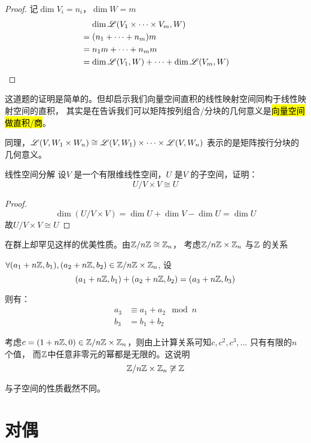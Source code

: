 \begin{proof}
    记\(\dim V_{i}=n_{i}\)，\(\dim W=m\)
    \begin{align*}
        &\mathrel{\phantom{=}}\dim \mathscr{L}(V_{1} \times
        \dots \times V_{m}, W) \\
        &= (n_1+\dots+n_{m})m \\
        &= n_{1}m + \dots + n_{m}m \\
        &= \dim \mathscr{L}(V_{1},W) + \dots +
        \dim \mathscr{L}(V_{m},W)
    \end{align*}
\end{proof}
这道题的证明是简单的。但却启示我们向量空间直积的线性映射空间同构于线性映射空间的直积，
其实是在告诉我们可以矩阵按列组合/分块的几何意义是\hl{向量空间做直积/商}。

同理，\(\mathscr{L}(V,W_1\times W_{n})\cong
    \mathscr{L}(V,W_1)\times \dots \times
\mathscr{L}(V,W_{n})\) 表示的是矩阵按行分块的几何意义。

\begin{problem}{线性空间分解}
    设\(V\) 是一个有限维线性空间，\(U\) 是\(V\) 的子空间，证明：
    \[
        U/V \times V \cong U
    \]
\end{problem}

\begin{proof}
    \[
        \dim (U/V \times V) = \dim U + \dim V - \dim U = \dim U
    \]
    故\(U/V \times V \cong U\)
\end{proof}

在群上却罕见这样的优美性质。由\(\mathbb{Z}/n\mathbb{Z} \cong
\mathbb{Z}_{n}\)，
考虑\(\mathbb{Z}/n\mathbb{Z}\times\mathbb{Z}_{n}\) 与\(\mathbb{Z}\) 的关系

\(\forall (a_1+n\mathbb{Z}, b_1),(a_2+n\mathbb{Z}, b_2) \in
\mathbb{Z}/n\mathbb{Z} \times \mathbb{Z}_{n}\), 设\[
    (a_1+n\mathbb{Z}, b_1)+(a_2+n\mathbb{Z}, b_2) =
    (a_3+n\mathbb{Z}, b_3)
\]

则有：
\begin{align*}
    a_3 &\equiv a_1 + a_2 \mod n \\
    b_3 &= b_1 + b_2
\end{align*}

考虑\(c=(1+n\mathbb{Z},0) \in \mathbb{Z}/n\mathbb{Z} \times
\mathbb{Z}_{n}\)，则由上计算关系可知\(c, c^{2}, c^{3}, \dots \) 只有有限的\(n\) 个值，
而\(\mathbb{Z}\)中任意非零元的幂都是无限的。这说明
\[
    \mathbb{Z}/n\mathbb{Z} \times \mathbb{Z}_{n} \not\cong \mathbb{Z}
\]

与子空间的性质截然不同。

\section{对偶}

